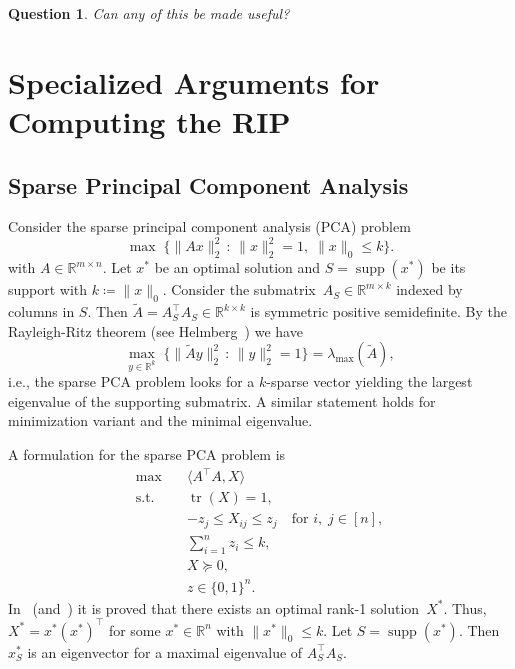 \documentclass[10pt, a4paper]{article}
\DeclareMathOperator{\supp}{supp}
\DeclareMathOperator{\tr}{tr}
\newcommand{\suchthat}{\,:\,}
\newcommand{\define}{\coloneqq}
\newcommand{\Norm}[2]{\lVert{#1}\rVert_{#2}}
\newcommand{\skal}[2]{\langle{#1},{#2}\rangle}
\newcommand{\T}{^{\top}}
\newcommand{\R}{\mathds{R}}
\newtheorem{question}[theorem]{Question}
\begin{document}
\begin{question}
  Can any of this be made useful?
\end{question}


\section{Specialized Arguments for Computing the RIP}

\subsection{Sparse Principal Component Analysis}

Consider the sparse principal component analysis (PCA) problem
\[
  \max\; \{\Norm{Ax}{2}^2 \suchthat \Norm{x}{2}^2 = 1,\; \Norm{x}{0} \leq k\}. 
\]
with $A \in \R^{m \times n}$.  Let $x^*$ be an optimal solution and
$S = \supp(x^*)$ be its support with $k \define \Norm{x}{0}$. Consider the
submatrix~$A_S \in \R^{m \times k}$ indexed by columns in $S$. Then
$\tilde{A} = A_S\T A_S^{\phantom{T}} \in \R^{k \times k}$ is symmetric positive
semidefinite. By the Rayleigh-Ritz theorem (see
Helmberg~\cite[Thm.~A.0.4]{Hel00}) we have
\[
  \max_{y \in \R^k} \; \{\Norm{\tilde{A}y}{2}^2 \suchthat \Norm{y}{2}^2 =
  1\} = \lambda_{\max}(\tilde{A}),
\]
i.e., the sparse PCA problem looks for a $k$-sparse vector yielding the
largest eigenvalue of the supporting submatrix. A similar statement holds
for minimization variant and the minimal eigenvalue.

A formulation for the sparse PCA problem is
\begin{subequations}\label{eq:SPCA}
  \begin{align}
    \max \quad & \skal{A\T A}{X} \\
    \text{s.t.} \quad & \tr(X) = 1, \\
    & -z_j \leq X_{ij} \leq z_j \quad \text{for } i,\; j \in [n],\label{eq:SPCAcouple} \\
    & \sum_{i=1}^n z_i \leq k,\\
    & X \succeq 0, \\
    & z \in \{0,1\}^n.
  \end{align}
\end{subequations}
In~\cite{GalP16} (and~\cite{LiX20}) it is proved that there exists an
optimal rank-1 solution~$X^*$. Thus, $X^* = x^* (x^*)\T$ for some
$x^* \in \R^n$ with $\Norm{x^*}{0} \leq k$. Let $S = \supp(x^*)$. Then
$x^*_S$ is an eigenvector for a maximal eigenvalue of
$A_S\T A_S^{\phantom{T}}$.
\end{document}
